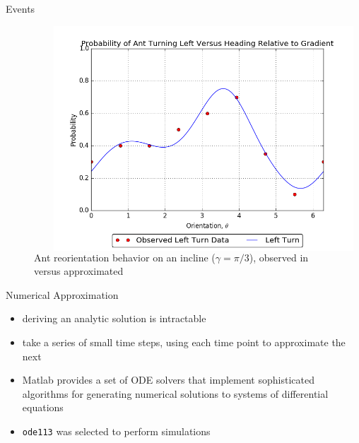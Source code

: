 \begin{frame}{Events}
\begin{figure}
\begin{columns}[T,onlytextwidth]
\begin{minipage}[]{0.315\textwidth}
\end{minipage}%
\begin{minipage}[]{0.045\textwidth}
~
\end{minipage}%
\begin{minipage}[]{0.54\textwidth}
    \includegraphics[width = \textwidth]{images/l_result}
\end{minipage}%
\begin{minipage}[]{0.05\textwidth}
~
\end{minipage}%
\end{columns}
\caption{Ant reorientation behavior on an incline ($\gamma = \pi/3$), observed in \cite{khuong_how_2013} versus approximated}
\end{figure}
\end{frame}


\begin{frame}{Numerical Approximation}

\begin{itemize}
	\item deriving an analytic solution is intractable
    \item take a series of small time steps, using each time point to approximate the next
    \item Matlab provides a set of ODE solvers that implement sophisticated algorithms for generating numerical solutions to systems of differential equations
    \item \texttt{ode113} was selected to perform simulations
\end{itemize}
\end{frame}

